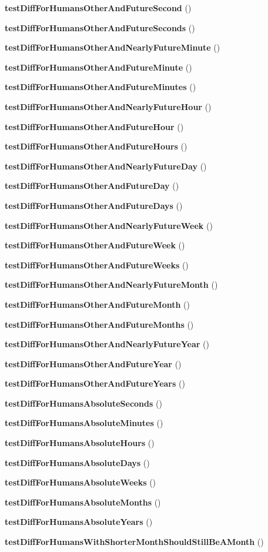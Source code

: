\begin{DoxyCompactItemize}
{\bf test\+Diff\+For\+Humans\+Other\+And\+Future\+Second} ()
\item 
{\bf test\+Diff\+For\+Humans\+Other\+And\+Future\+Seconds} ()
\item 
{\bf test\+Diff\+For\+Humans\+Other\+And\+Nearly\+Future\+Minute} ()
\item 
{\bf test\+Diff\+For\+Humans\+Other\+And\+Future\+Minute} ()
\item 
{\bf test\+Diff\+For\+Humans\+Other\+And\+Future\+Minutes} ()
\item 
{\bf test\+Diff\+For\+Humans\+Other\+And\+Nearly\+Future\+Hour} ()
\item 
{\bf test\+Diff\+For\+Humans\+Other\+And\+Future\+Hour} ()
\item 
{\bf test\+Diff\+For\+Humans\+Other\+And\+Future\+Hours} ()
\item 
{\bf test\+Diff\+For\+Humans\+Other\+And\+Nearly\+Future\+Day} ()
\item 
{\bf test\+Diff\+For\+Humans\+Other\+And\+Future\+Day} ()
\item 
{\bf test\+Diff\+For\+Humans\+Other\+And\+Future\+Days} ()
\item 
{\bf test\+Diff\+For\+Humans\+Other\+And\+Nearly\+Future\+Week} ()
\item 
{\bf test\+Diff\+For\+Humans\+Other\+And\+Future\+Week} ()
\item 
{\bf test\+Diff\+For\+Humans\+Other\+And\+Future\+Weeks} ()
\item 
{\bf test\+Diff\+For\+Humans\+Other\+And\+Nearly\+Future\+Month} ()
\item 
{\bf test\+Diff\+For\+Humans\+Other\+And\+Future\+Month} ()
\item 
{\bf test\+Diff\+For\+Humans\+Other\+And\+Future\+Months} ()
\item 
{\bf test\+Diff\+For\+Humans\+Other\+And\+Nearly\+Future\+Year} ()
\item 
{\bf test\+Diff\+For\+Humans\+Other\+And\+Future\+Year} ()
\item 
{\bf test\+Diff\+For\+Humans\+Other\+And\+Future\+Years} ()
\item 
{\bf test\+Diff\+For\+Humans\+Absolute\+Seconds} ()
\item 
{\bf test\+Diff\+For\+Humans\+Absolute\+Minutes} ()
\item 
{\bf test\+Diff\+For\+Humans\+Absolute\+Hours} ()
\item 
{\bf test\+Diff\+For\+Humans\+Absolute\+Days} ()
\item 
{\bf test\+Diff\+For\+Humans\+Absolute\+Weeks} ()
\item 
{\bf test\+Diff\+For\+Humans\+Absolute\+Months} ()
\item 
{\bf test\+Diff\+For\+Humans\+Absolute\+Years} ()
\item 
{\bf test\+Diff\+For\+Humans\+With\+Shorter\+Month\+Should\+Still\+Be\+A\+Month} ()
\end{DoxyCompactItemize}
